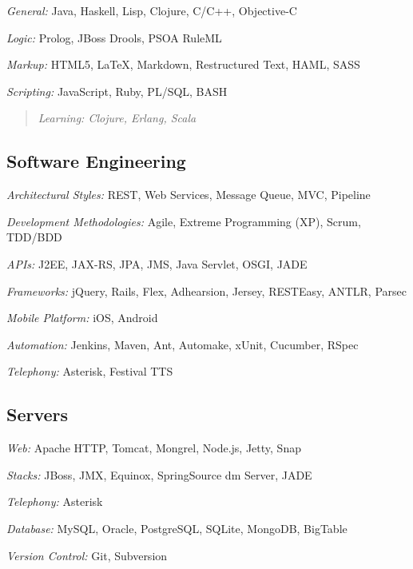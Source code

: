 \documentclass[11pt]{article}
\begin{document}
\emph{General:}
   Java, Haskell, Lisp, Clojure, C/C++, Objective-C

\emph{Logic:}
   Prolog, JBoss Drools, PSOA RuleML

\label{systems-scripting}
\label{scripting}

\emph{Markup:}
   HTML5, \LaTeX{}, Markdown, Restructured Text, HAML, SASS

\emph{Scripting:}
   JavaScript, Ruby, PL/SQL, BASH


\begin{quote}
\emph{Learning: Clojure, Erlang, Scala}
\end{quote}
\subsection{Software Engineering}
\label{sec-5-2}
\label{software-engineering}
\label{integration}
\label{API}
\label{architecture}


\emph{Architectural Styles:}
    REST, Web Services, Message Queue, MVC, Pipeline

\emph{Development Methodologies:}
    Agile, Extreme Programming (XP), Scrum, TDD/BDD

\emph{APIs:}
    J2EE, JAX-RS, JPA, JMS, Java Servlet, OSGI, JADE

\emph{Frameworks:}
    jQuery, Rails, Flex, Adhearsion, Jersey, RESTEasy, ANTLR, Parsec

\label{mobile-application-development}

\emph{Mobile Platform:}
iOS, Android

\label{automation}

\emph{Automation:}
Jenkins, Maven, Ant, Automake, xUnit, Cucumber, RSpec

\label{telephony}

\emph{Telephony:} Asterisk, Festival TTS
\subsection{Servers}
\label{sec-5-3}

\emph{Web:} Apache HTTP, Tomcat, Mongrel, Node.js, Jetty, Snap

\emph{Stacks:} JBoss, JMX, Equinox, SpringSource dm Server, JADE

\emph{Telephony:} Asterisk

\label{database-management}

\emph{Database:} MySQL, Oracle, PostgreSQL, SQLite, MongoDB, BigTable

\emph{Version Control:} Git, Subversion
\end{document}
